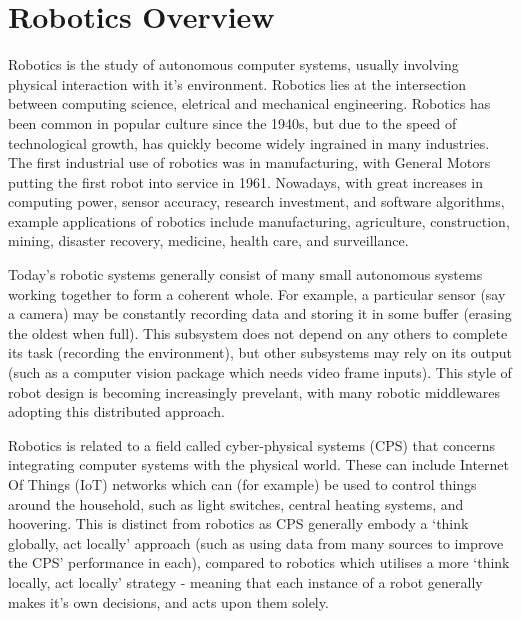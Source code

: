 \documentclass[../dissertation.tex]{subfiles}
\begin{document}
\section{Robotics Overview}
\label{background-robotics}

Robotics is the study of autonomous computer systems, usually involving physical interaction with it's environment. Robotics lies at the intersection between computing science, eletrical and mechanical engineering. Robotics has been common in popular culture since the 1940s\cite{hockstein2007history}, but due to the speed of technological growth, has quickly become widely ingrained in many industries. The first industrial use of robotics was in manufacturing, with General Motors putting the first robot into service in 1961\cite{hagele2016ashorthistory}. Nowadays, with great increases in computing power, sensor accuracy, research investment, and software algorithms, example applications of robotics include manufacturing, agriculture, construction, mining, disaster recovery, medicine, health care, and surveillance\cite{hagele2016robotsatwork}.

Today's robotic systems generally consist of many small autonomous systems working together to form a coherent whole\cite{4058987}. For example, a particular sensor (say a camera) may be constantly recording data and storing it in some buffer (erasing the oldest when full). This subsystem does not depend on any others to complete its task (recording the environment), but other subsystems may rely on its output (such as a computer vision package which needs video frame inputs). This style of robot design is becoming increasingly prevelant, with many robotic middlewares adopting this distributed approach.

Robotics is related to a field called cyber-physical systems (CPS) that concerns integrating computer systems with the physical world\cite{Lee:EECS-2008-8}. These can include Internet Of Things (IoT) networks\cite{atzori2010internet} which can (for example) be used to control things around the household, such as light switches, central heating systems, and hoovering. This is distinct from robotics as CPS generally embody a `think globally, act locally' approach\cite{gordonthink} (such as using data from many sources to improve the CPS' performance in each), compared to robotics which utilises a more `think locally, act locally' strategy - meaning that each instance of a robot generally makes it's own decisions, and acts upon them solely.
\end{document}
